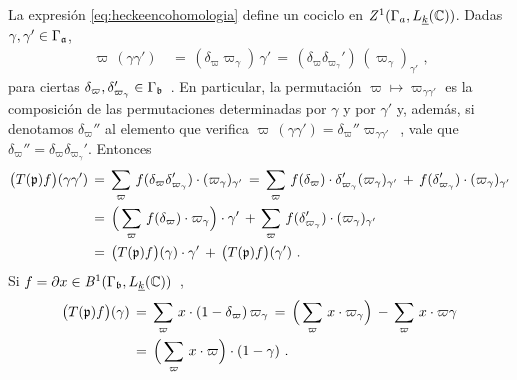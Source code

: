 \begin{obsHeckeEnCohomologia}\label{obs:heckeencohomologia}
	La expresi\'{o}n \eqref{eq:heckeencohomologia} define un cociclo en
	$\cociclos[1]{\Gamma_{a},L_{\peso{k}}(\bb{C})}$. Dadas
	$\gamma,\gamma'\in\Gamma_{\frak{a}}$,
	\begin{align*}
		\varpi\,(\gamma\gamma') & \,=\,
			(\delta_{\varpi}\varpi_{\gamma})\,\gamma' \,=\,
			(\delta_{\varpi}\delta_{\varpi_{\gamma}}')\,
				(\varpi_{\gamma})_{\gamma'}
		\text{ ,}
	\end{align*}
	para ciertas
	\begin{math}
		\delta_{\varpi},\delta_{\varpi_{\gamma}}'\in\Gamma_{\frak{b}}
	\end{math}~.
	En particular, la permutaci\'{o}n
	\begin{math}
		\varpi\mapsto \varpi_{\gamma\gamma'}
	\end{math}
	es la composici\'{o}n de las permutaciones determinadas por $\gamma$ y
	por $\gamma'$ y, adem\'{a}s, si denotamos $\delta_{\varpi}''$ al
	elemento que verifica
	\begin{math}
		\varpi\,(\gamma\gamma')=\delta_{\varpi}''\varpi_{\gamma\gamma'}
	\end{math}~,
	vale que $\delta_{\varpi}''=\delta_{\varpi}\delta_{\varpi_{\gamma}}'$.
	Entonces
	\begin{align*}
		\big(T(\frak{p})f\big)(\gamma\gamma') & \,=\,\sum_{\varpi}\,
			f(\delta_{\varpi}\delta_{\varpi_{\gamma}}'
				)\cdot(\varpi_{\gamma})_{\gamma'} \,=\,
			\sum_{\varpi}\,f(\delta_{\varpi})\cdot
				\delta_{\varpi_{\gamma}}'
				(\varpi_{\gamma})_{\gamma'} \,+\,
				f(\delta_{\varpi_{\gamma}}')\cdot
				(\varpi_{\gamma})_{\gamma'} \\
		& \,=\,\Big(\sum_{\varpi}\,f(\delta_{\varpi})\cdot
			\varpi_{\gamma}\Big)\cdot\gamma' \,+\,
			\sum_{\varpi}\,f(\delta_{\varpi_{\gamma}}')\cdot
				(\varpi_{\gamma})_{\gamma'} \\
		& \,=\,\big(T(\frak{p})f\big)(\gamma)\cdot\gamma' \,+\,
			\big(T(\frak{p})f\big)(\gamma')
		\text{ .}
	\end{align*}
	Si
	\begin{math}
		f =\partial x\in
			\cobordes[1]{\Gamma_{\frak{b}},L_{\peso{k}}(\bb{C})}
	\end{math}~,
	\begin{align*}
		\big(T(\frak{p})f\big)(\gamma) & \,=\,\sum_{\varpi}\,
			x\cdot (1-\delta_{\varpi})\,\varpi_{\gamma} \,=\,
			\Big(\sum_{\varpi}\,x\cdot\varpi_{\gamma}\Big)\,-\,
			\sum_{\varpi}\,x\cdot\varpi\gamma \\
		& \,=\,\Big(\sum_{\varpi}\,x\cdot\varpi\Big)\cdot(1-\gamma)
		\text{ .}
	\end{align*}
\end{obsHeckeEnCohomologia}

